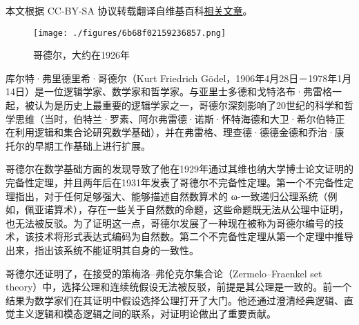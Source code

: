 
本文根据 CC-BY-SA 协议转载翻译自维基百科\href{https://en.wikipedia.org/wiki/Kurt_G\%C3\%B6del}{相关文章}。

\begin{figure}[ht]
\centering
\texttt{[image: ./figures/6b68f02159236857.png]}
\caption{哥德尔，大约在1926年} \label{fig_KRT_1}
\end{figure}
库尔特·弗里德里希·哥德尔（Kurt Friedrich Gödel，1906年4月28日－1978年1月14日）是一位逻辑学家、数学家和哲学家。与亚里士多德和戈特洛布·弗雷格一起，被认为是历史上最重要的逻辑学家之一，哥德尔深刻影响了20世纪的科学和哲学思维（当时，伯特兰·罗素、阿尔弗雷德·诺斯·怀特海德和大卫·希尔伯特正在利用逻辑和集合论研究数学基础），并在弗雷格、理查德·德德金德和乔治·康托尔的早期工作基础上进行扩展。

哥德尔在数学基础方面的发现导致了他在1929年通过其维也纳大学博士论文证明的完备性定理，并且两年后在1931年发表了哥德尔不完备性定理。第一个不完备性定理指出，对于任何足够强大、能够描述自然数算术的 ω-一致递归公理系统（例如，佩亚诺算术），存在一些关于自然数的命题，这些命题既无法从公理中证明，也无法被反驳。为了证明这一点，哥德尔发展了一种现在被称为哥德尔编号的技术，该技术将形式表达式编码为自然数。第二个不完备性定理从第一个定理中推导出来，指出该系统不能证明其自身的一致性。

哥德尔还证明了，在接受的策梅洛–弗伦克尔集合论（Zermelo–Fraenkel set theory）中，选择公理和连续统假设无法被反驳，前提是其公理是一致的。前一个结果为数学家们在其证明中假设选择公理打开了大门。他还通过澄清经典逻辑、直觉主义逻辑和模态逻辑之间的联系，对证明论做出了重要贡献。